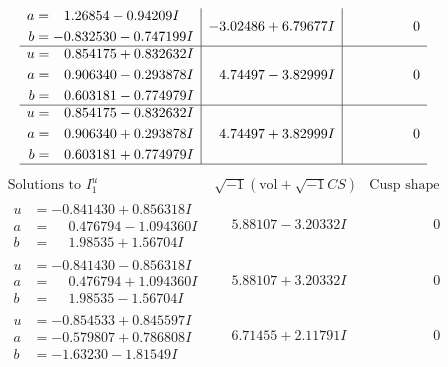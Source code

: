 \documentclass[1p]{elsarticle_modified}
\theoremstyle{definition}
\newcommand{\I}{\sqrt{-1}}
\begin{document}
$$\begin{array}{c|c|c}
\begin{aligned}
a &= \phantom{-}1.26854 - 0.94209 I \\
b &= -0.832530 - 0.747199 I\end{aligned}
 & -3.02486 + 6.79677 I & \phantom{-0.000000 } 0 \\ \hline\begin{aligned}
u &= \phantom{-}0.854175 + 0.832632 I \\
a &= \phantom{-}0.906340 - 0.293878 I \\
b &= \phantom{-}0.603181 - 0.774979 I\end{aligned}
 & \phantom{-}4.74497 - 3.82999 I & \phantom{-0.000000 } 0 \\ \hline\begin{aligned}
u &= \phantom{-}0.854175 - 0.832632 I \\
a &= \phantom{-}0.906340 + 0.293878 I \\
b &= \phantom{-}0.603181 + 0.774979 I\end{aligned}
 & \phantom{-}4.74497 + 3.82999 I & \phantom{-0.000000 } 0\\
 \hline 
 \end{array}$$\newpage$$\begin{array}{c|c|c}  
\text{Solutions to }I^u_{1}& \I (\text{vol} + \sqrt{-1}CS) & \text{Cusp shape}\\
 \hline 
\begin{aligned}
u &= -0.841430 + 0.856318 I \\
a &= \phantom{-}0.476794 - 1.094360 I \\
b &= \phantom{-}1.98535 + 1.56704 I\end{aligned}
 & \phantom{-}5.88107 - 3.20332 I & \phantom{-0.000000 } 0 \\ \hline\begin{aligned}
u &= -0.841430 - 0.856318 I \\
a &= \phantom{-}0.476794 + 1.094360 I \\
b &= \phantom{-}1.98535 - 1.56704 I\end{aligned}
 & \phantom{-}5.88107 + 3.20332 I & \phantom{-0.000000 } 0 \\ \hline\begin{aligned}
u &= -0.854533 + 0.845597 I \\
a &= -0.579807 + 0.786808 I \\
b &= -1.63230 - 1.81549 I\end{aligned}
 & \phantom{-}6.71455 + 2.11791 I & \phantom{-0.000000 } 0 \\ \hline\begin{aligned}

\end{aligned}
\end{array}$$
\end{document}
